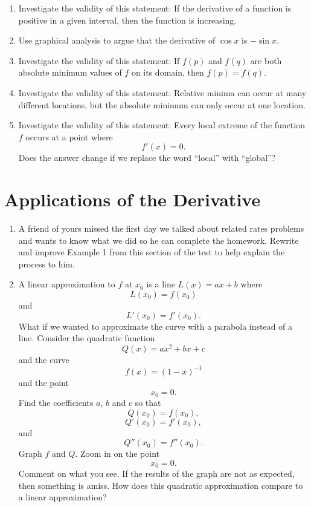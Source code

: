\begin{enumerate}
\item  Investigate the validity of this statement:  If the derivative of a function is positive in a given interval, then the function is increasing.

\item  Use graphical analysis to argue that the derivative of $\cos x$ is $-\sin x$.   \cite{SM}

\item  Investigate the validity of this statement:  If $f(p)$ and $f(q)$ are both absolute minimum values of $f$ on its domain, then $f(p) = f(q)$.   \cite{EP}

\item  Investigate the validity of this statement:  Relative minima can occur at many different locations, but the absolute minimum can only occur at one location.

\item  Investigate the validity of this statement:  Every local extreme of the function $f$ occurs at a point where $$f'(x) = 0.$$  Does the answer change if we replace the word ``local'' with ``global''?

 \end{enumerate}\section{Applications of the Derivative}\begin{enumerate}

\item  A friend of yours missed the first day we talked about related rates problems and wants to know what we did so he can complete the homework.  Rewrite and improve Example 1 from this section of the test to help explain the process to him.  

\item  A linear approximation to $f$ at $x_0$ is a line $L(x) = ax + b$ where $$L\left( {x_0 } \right) = f\left( {x_0 } \right)$$ and $$L'\left( {x_0 } \right) = f'\left( {x_0 } \right).$$  What if we wanted to approximate the curve with a parabola instead of a line.  Consider the quadratic function $$Q\left( x \right) = ax^2  + bx + c$$ and the curve $$f\left( x \right) = \left( {1 - x} \right)^{ - 1} $$ and the point $$x_0  = 0.$$  Find the coefficients $a$, $b$ and $c$ so that $$Q\left( {x_0 } \right) = f\left( {x_0 } \right),$$ $$Q'\left( {x_0 } \right) = f'\left( {x_0 } \right),$$ and $$Q''\left( {x_0 } \right) = f''\left( {x_0 } \right).$$  Graph $f$ and $Q$.  Zoom in on the point $$x_0  = 0.$$  Comment on what you see. If the results of the graph are not as expected, then something is amiss.  How does this quadratic approximation compare to a linear approximation?


\end{enumerate}
